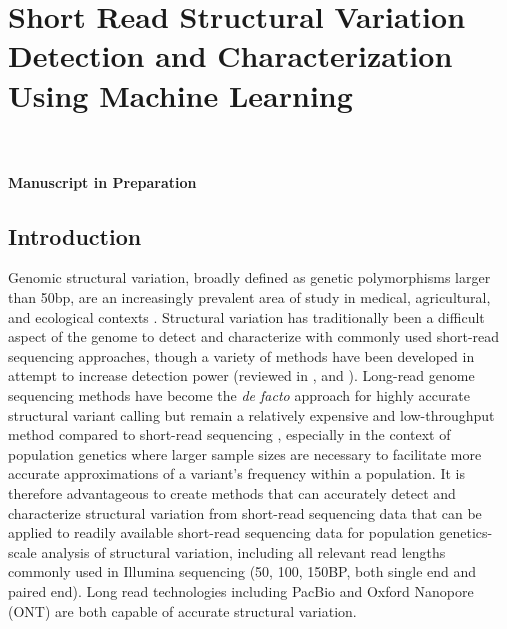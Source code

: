 \chapter{Short Read Structural Variation Detection and Characterization Using Machine Learning}

\\
\\
\textbf{Manuscript in Preparation}

\section{Introduction}

Genomic structural variation, broadly defined as genetic polymorphisms larger than 50bp, are an increasingly prevalent area of study in medical, agricultural, and ecological contexts \cite{sudmantIntegratedMapStructural2015,duAnalysisStructuralVariants2021,weissensteinerDiscoveryPopulationGenomics2020,chakrabortyEvolutionGenomeStructure2021,chakrabortyHiddenGeneticVariation2018,merkerLongreadGenomeSequencing2018,bickhartChallengesImportanceStructural2014}. Structural variation has traditionally been a difficult aspect of the genome to detect and characterize with commonly used short-read sequencing approaches, though a variety of methods have been developed in attempt to increase detection power \cite{clealDysguEfficientStructural2022,rauschDELLYStructuralVariant2012,chenMantaRapidDetection2016,belyeuSamplotPlatformStructural2021,popicCueDeeplearningFramework2023}(reviewed in \cite{cameronComprehensiveEvaluationCharacterisation2019}, \cite{mahmoudStructuralVariantCalling2019} and \cite{alkanGenomeStructuralVariation2011}). Long-read genome sequencing methods have become the \textit{de facto} approach for highly accurate structural variant calling but remain a relatively expensive and low-throughput method compared to short-read sequencing \cite{merkerLongreadGenomeSequencing2018,dierckxsensBenchmarkStructuralVariation2021,chenDecipheringExactBreakpoints2023,ahsanSurveyAlgorithmsDetection2023,decosterPopulationscaleLongreadSequencing2021}, especially in the context of population genetics where larger sample sizes are necessary to facilitate more accurate approximations of a variant's frequency within a population. It is therefore advantageous to create methods that can accurately detect and characterize structural variation from short-read sequencing data that can be applied to readily available short-read sequencing data for population genetics-scale analysis of structural variation, including all relevant read lengths commonly used in Illumina sequencing (50, 100, 150BP, both single end and paired end). Long read technologies including PacBio and Oxford Nanopore (ONT) are both capable of accurate structural variation.

